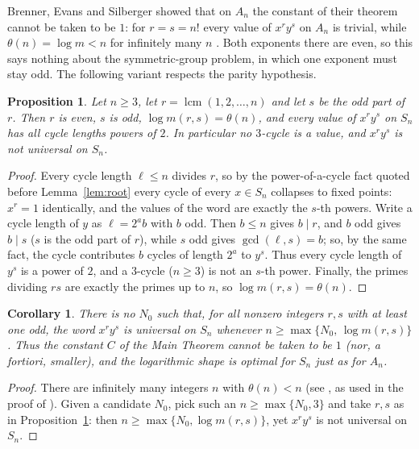 \documentclass[11pt]{amsart}
\numberwithin{equation}{section}
\newtheorem{corollary}[theorem]{Corollary}
\newtheorem{proposition}[theorem]{Proposition}
\theoremstyle{remark}
\begin{document}
Brenner, Evans and Silberger showed that on $A_n$ the constant of their theorem
cannot be taken to be $1$: for $r=s=n!$ every value of $x^ry^s$ on $A_n$ is
trivial, while $\theta(n)=\log m<n$ for infinitely many $n$ \cite[proof of
Theorem~3$'$]{BES}. Both exponents there are even, so this says nothing about
the symmetric-group problem, in which one exponent must stay odd. The following
variant respects the parity hypothesis.

\begin{proposition}\label{prop:lower}
Let $n\ge3$, let $r=\operatorname{lcm}(1,2,\dots,n)$ and let $s$ be the odd part
of $r$. Then $r$ is even, $s$ is odd, $\log m(r,s)=\theta(n)$, and every value
of $x^ry^s$ on $S_n$ has all cycle lengths powers of $2$. In particular no
$3$-cycle is a value, and $x^ry^s$ is not universal on $S_n$.
\end{proposition}

\begin{proof}
Every cycle length $\ell\le n$ divides $r$, so by the power-of-a-cycle fact
quoted before Lemma~\ref{lem:root} every cycle of every $x\in S_n$ collapses to
fixed points: $x^r=1$ identically, and the values of the word are exactly the
$s$-th powers. Write a cycle length of $y$ as $\ell=2^ab$ with $b$ odd. Then
$b\le n$ gives $b\mid r$, and $b$ odd gives $b\mid s$ ($s$ is the odd part of
$r$), while $s$ odd gives $\gcd(\ell,s)=b$; so, by the
same fact, the cycle contributes $b$ cycles of length $2^a$ to $y^s$. Thus
every cycle length of $y^s$ is a power of $2$, and a $3$-cycle ($n\ge3$) is not
an $s$-th power. Finally, the primes dividing $rs$ are exactly the primes up to
$n$, so $\log m(r,s)=\theta(n)$.
\end{proof}

\begin{corollary}\label{cor:lower}
There is no $N_0$ such that, for all nonzero integers $r,s$ with at least one
odd, the word $x^ry^s$ is universal on $S_n$ whenever
$n\ge\max\{N_0,\,\log m(r,s)\}$. Thus the constant $C$ of the Main Theorem
cannot be taken to be $1$ (nor, a fortiori, smaller), and the logarithmic shape
is optimal for $S_n$ just as for $A_n$.
\end{corollary}

\begin{proof}
There are infinitely many integers $n$ with $\theta(n)<n$ (see \cite[p.~67]{RS},
as used in the proof of \cite[Theorem~3$'$]{BES}). Given a candidate $N_0$, pick
such an $n\ge\max\{N_0,3\}$ and take $r,s$ as in
Proposition~\ref{prop:lower}: then $n\ge\max\{N_0,\log m(r,s)\}$, yet $x^ry^s$
is not universal on $S_n$.
\end{proof}
\end{document}
